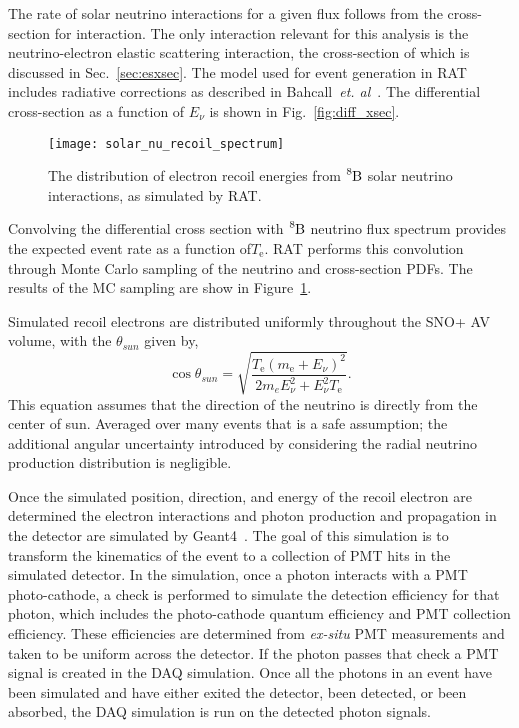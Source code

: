 The rate of solar neutrino interactions for a given flux follows from the cross-section for
interaction. The only interaction relevant for this analysis is the
neutrino-electron elastic scattering interaction, the cross-section of which
is discussed in Sec.~\ref{sec:esxsec}.
The model used for event generation in RAT includes radiative corrections as
described in Bahcall~\textit{et. al}~\citep{escrosssec}.
The differential cross-section as a function of $E_{\nu}$ is shown in Fig.~\ref{fig:diff_xsec}.

\begin{figure}[htbp]
  \centering
  \texttt{[image: solar\_nu\_recoil\_spectrum]}
  \caption[Solar Recoil Electron Spectrum]{
      The distribution of electron recoil energies from $\ce{^{8}B}$ solar neutrino
      interactions, as simulated by RAT\@.}
    \label{fig:recoil_spectrum}
\end{figure}

Convolving the differential cross section with $\ce{^{8}B}$ neutrino flux
spectrum provides the expected event rate as a function of$T_{\mathrm{e}}$. 
RAT performs this convolution through Monte Carlo sampling of the neutrino
and cross-section PDFs.
The results of the MC sampling are show in Figure~\ref{fig:recoil_spectrum}.

Simulated recoil electrons are distributed uniformly throughout the SNO+ AV volume, with
the $\theta_{sun}$ given by,
\begin{equation}
  \cos\theta_{sun} = \sqrt{\dfrac{T_{\mathrm{e}}(m_{\mathrm{e}}+E_{\nu})^{2}}{2m_{e}E_{\nu}^{2} + E_{\nu}^{2}T_{\mathrm{e}}}}\text{.}
  \label{eqn:costheta_te}
\end{equation}
This equation assumes that the direction of the neutrino is directly from the center of sun.
Averaged over many events that is a safe assumption; the additional angular uncertainty
introduced by considering the radial neutrino production distribution is negligible.

Once the simulated position, direction, and energy of the recoil electron are determined  the
electron interactions and  photon production and propagation in the detector are simulated
by Geant4~\citep{geant4}.
The goal of this simulation is to transform the kinematics of the event to
a collection of PMT hits in the simulated detector.
In the simulation, once a photon interacts with a PMT photo-cathode, a check is performed
to simulate the detection efficiency for that photon, which includes the photo-cathode quantum efficiency and
PMT collection efficiency.
These efficiencies are determined from \textit{ex-situ} PMT measurements and
taken to be uniform across the detector. %
If the photon passes that check a PMT signal is created in the DAQ simulation.
Once all the photons in an event have been simulated and have either exited the detector,
been detected, or been absorbed, the DAQ simulation is run on the detected photon signals.

